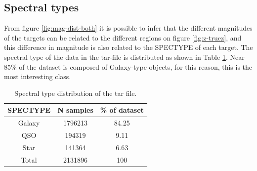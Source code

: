 \subsection{Spectral types}
From figure \ref{fig:mag-dist-both} it is possible to infer that the different magnitudes of the targets can be related to the different regions on figure \ref{fig:z-truez}, and this difference in magnitude is also related to the SPECTYPE of each target. The spectral type of the data in the tar-file is distributed as shown in Table \ref{tab:espectype-N}. Near 85\% of the dataset is composed of Galaxy-type objects, for this reason, this is the most interesting class.
\begin{table}[!h]
	\centering
	\begin{tabular}{c|c|c}
		
		SPECTYPE & N samples & \% of dataset \\ 
		\hline 
		Galaxy & 1796213 & 84.25 \\ 
		
		QSO & 194319 & 9.11 \\ 
		
		Star & 141364 & 6.63 \\ 
		
		Total & 2131896 & 100 \\ 
		
	\end{tabular} 
	\caption{Spectral type distribution of the tar file. }
	\label{tab:espectype-N}
\end{table}
